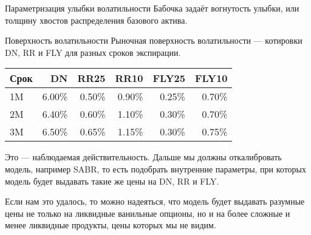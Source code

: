 \documentclass{beamer}
\begin{document}
\begin{frame}{Параметризация улыбки волатильности}
\justify
Бабочка задаёт вогнутость улыбки, или толщину хвостов распределения базового актива.

\centering
{}
\end{frame}



\begin{frame}{Поверхность волатильности}
\justify
Рыночная поверхность волатильности --- котировки DN, RR и FLY для разных сроков экспирации.

\justify
\centering
\begin{tabular}{l|r|r|r|r|r}
Срок & DN     & RR25   & RR10   & FLY25  & FLY10  \\ \hline
1M   & 6.00\% & 0.50\% & 0.90\% & 0.25\% & 0.70\% \\
2M   & 6.40\% & 0.60\% & 1.10\% & 0.30\% & 0.70\% \\
3M   & 6.50\% & 0.65\% & 1.15\% & 0.30\% & 0.75\% 
\end{tabular}

\justify
Это --- наблюдаемая действительность. Дальше мы должны откалибровать модель, например SABR, то есть подобрать внутренние параметры, при которых модель будет выдавать такие же цены на DN, RR и FLY.

\justify
Если нам это удалось, то можно надеяться, что модель будет выдавать разумные цены не только на ликвидные ванильные опционы, но и на более сложные и менее ликвидные продукты, цены которых мы не видим.
\end{frame}
\end{document}
